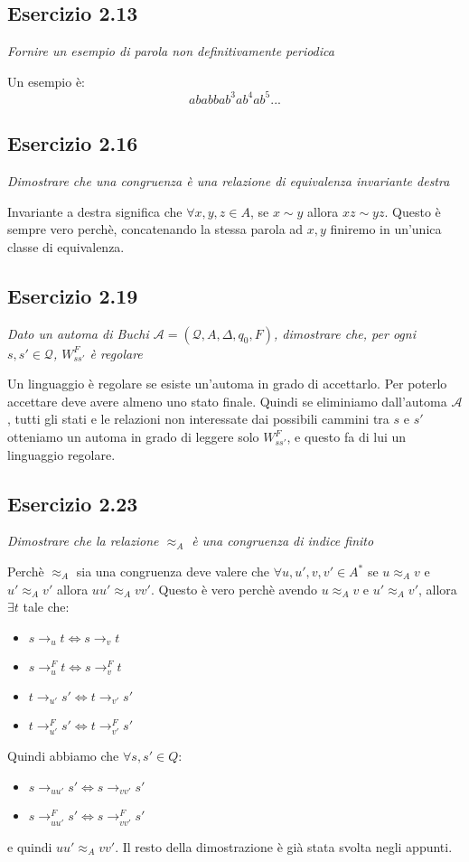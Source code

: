 \documentclass[12pt]{article}
\newcommand{\A}{\ensuremath{\mathcal{A}}\xspace}
\newcommand{\Buchi}{\ensuremath{\mathcal{A} = (\mathcal{Q},A,\Delta,q_0,F)}\xspace}
\begin{document}
\subsection*{Esercizio 2.13}
\textit{Fornire un esempio di parola non definitivamente periodica}

Un esempio è: $$ ababbab^3ab^4ab^5...$$


\subsection*{Esercizio 2.16}
\textit{Dimostrare che una congruenza è una relazione di equivalenza invariante destra}

Invariante a destra significa che $\forall x,y,z \in A$, se $x \sim y$ allora $xz \sim yz$. Questo è sempre vero perchè, concatenando la stessa parola ad $x,y$ finiremo in un'unica classe di equivalenza.

\subsection*{Esercizio 2.19}
\textit{Dato un automa di Buchi $\Buchi$, dimostrare che, per ogni $s,s' \in \mathcal{Q}$, $W^F_{ss'}$ è regolare}

Un linguaggio è regolare se esiste un'automa in grado di accettarlo. Per poterlo accettare deve avere almeno uno stato finale. Quindi se eliminiamo dall'automa \A, tutti gli stati e le relazioni non interessate dai possibili cammini tra $s$ e $s'$ otteniamo un automa in grado di leggere solo $W^F_{ss'}$, e questo fa di lui un linguaggio regolare.

\subsection*{Esercizio 2.23}
\textit{Dimostrare che la relazione $\approx_A$ è una congruenza di indice finito}

Perchè $\approx_A$ sia una congruenza deve valere che $\forall u,u',v,v' \in A^*$ se $ u\approx_A v$ e $u' \approx_A v'$ allora $uu' \approx_A vv'$. Questo è vero perchè avendo $ u \approx_A v$ e $u' \approx_A v'$, allora $\exists t$ tale che:
\begin{itemize}
	\item $s \rightarrow_u t \Leftrightarrow s \rightarrow_v t$
	\item $s \rightarrow_u^F t \Leftrightarrow s \rightarrow_v^F t$
	\item $t \rightarrow_{u'} s' \Leftrightarrow t \rightarrow_{v'} s'$
	\item $t \rightarrow_{u'}^F s' \Leftrightarrow t \rightarrow_{v'}^F s'$
\end{itemize} 
Quindi abbiamo che $\forall s,s' \in Q$:
\begin{itemize}
	\item $s \rightarrow_{uu'} s' \Leftrightarrow s \rightarrow_{vv'} s'$
	\item $s \rightarrow_{uu'}^F s' \Leftrightarrow s \rightarrow_{vv'}^F s'$
\end{itemize} 
e quindi $uu' \approx_A vv'$.
Il resto della dimostrazione è già stata svolta negli appunti.
\end{document}
